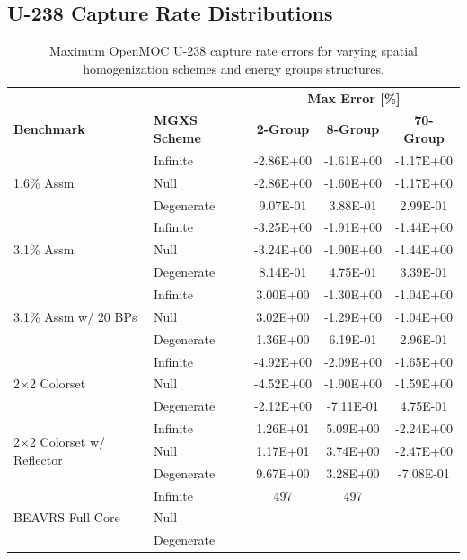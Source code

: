 \subsection{U-238 Capture Rate Distributions}
\label{subsec:chap8-capt-rates}

\begin{table}[h!]
  \centering
  \caption[Maximum OpenMOC U-238 capture rate errors]{Maximum OpenMOC U-238 capture rate errors for varying spatial homogenization schemes and energy groups structures.}
  \small
  \label{table:chap8-openmoc-max-capt-rates}
  \vspace{6pt}
  \begin{tabular}{l l c c c}
  \toprule
  \rowcolor{lightgray}
  & & \multicolumn{3}{c}{\cellcolor{lightgray} \textbf{Max Error [\%]}} \\
  \multirow{-2}{*}{\cellcolor{lightgray} \bf Benchmark} &
  \multirow{-2}{*}{\cellcolor{lightgray} \bf \ac{MGXS} Scheme} &
  {\cellcolor{lightgray} \bf 2-Group} &
  {\cellcolor{lightgray} \bf 8-Group} &
  {\cellcolor{lightgray} \bf 70-Group} \\
  \midrule
\multirow{3}{*}{\parbox{2.5cm}{1.6\% Assm}} & Infinite & -2.86E+00 & -1.61E+00 & -1.17E+00 \\
& Null & -2.86E+00 & -1.60E+00 & -1.17E+00 \\
& Degenerate & 9.07E-01 & 3.88E-01 & 2.99E-01 \\
  \midrule
\multirow{3}{*}{\parbox{2.5cm}{3.1\% Assm}} & Infinite & -3.25E+00 & -1.91E+00 & -1.44E+00 \\
& Null & -3.24E+00 & -1.90E+00 & -1.44E+00 \\
& Degenerate & 8.14E-01 & 4.75E-01 & 3.39E-01 \\
  \midrule
\multirow{3}{*}{\parbox{2.5cm}{3.1\% Assm w/ 20 BPs}} & Infinite & 3.00E+00 & -1.30E+00 & -1.04E+00 \\
& Null & 3.02E+00 & -1.29E+00 & -1.04E+00 \\
& Degenerate & 1.36E+00 & 6.19E-01 & 2.96E-01 \\
  \midrule
\multirow{3}{*}{\parbox{2.5cm}{2$\times$2 Colorset}} & Infinite & -4.92E+00 & -2.09E+00 & -1.65E+00 \\
& Null & -4.52E+00 & -1.90E+00 & -1.59E+00 \\
& Degenerate & -2.12E+00 & -7.11E-01 & 4.75E-01 \\
  \midrule
\multirow{3}{*}{\parbox{2.5cm}{2$\times$2 Colorset w/ Reflector}} & Infinite & 1.26E+01 & 5.09E+00 & -2.24E+00 \\
& Null & 1.17E+01 & 3.74E+00 & -2.47E+00 \\
& Degenerate & 9.67E+00 & 3.28E+00 & -7.08E-01 \\
  \midrule
  \multirow{3}{*}{\parbox{2cm}{\ac{BEAVRS} Full Core}} & Infinite & 497 & 497 & \\
  & Null & & & \\
  & Degenerate & & & \\
  \bottomrule
\end{tabular}
\end{table}


